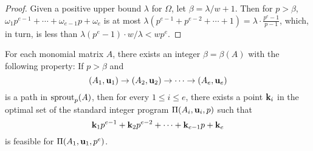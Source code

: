 \documentclass[11pt]{amsart}
\begin{document}
\begin{proof}
   Given a positive upper bound $\lambda$ for $\Omega$, let $\beta = \lambda/w  + 1$.
   Then for $p>\beta$, $\omega_1 p^{e-1} + \cdots + \omega_{e-1}  p + \omega_e$ is at most $\lambda(p^{e-1} + p^{e-2} + \cdots + 1) = \lambda \cdot \frac{p^e-1}{p-1}$, which, in turn, is less than $\lambda (p^e-1) \cdot w/\lambda < w p^e$.
\end{proof}

\begin{theorem}
\label{ILL: T}
   For each monomial matrix $A$, there exists an integer $\beta = \beta(A)$ with the following property\textup:
   If $p>\beta$ and \[ (A_1, \mathbf{u}_1) \to (A_2, \mathbf{u}_2) \to \cdots \to (A_e, \mathbf{u}_e)\] is a path in $\operatorname{sprout}_p(A)$, then for every $1 \leq i \leq e$, there exists a point $\mathbf{k}_i$ in the optimal set of the standard integer program $\Pi(A_i, \mathbf{u}_i,p)$  such that
   \[
      \mathbf{k}_1 p^{e-1} + \mathbf{k}_2 p^{e-2} + \cdots + \mathbf{k}_{e-1} p + \mathbf{k}_e
   \]
   is feasible for $\Pi(A_1, \mathbf{u}_1, p^e)$.
 \end{theorem}
\end{document}

